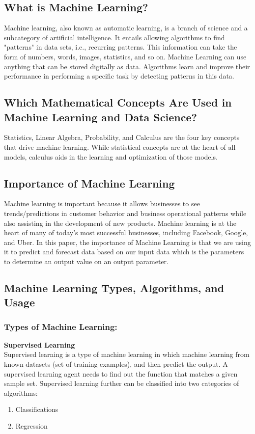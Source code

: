 \subsection{What is Machine Learning?}
Machine learning, also known as automatic learning, is a branch of science and a subcategory of artificial intelligence. It entails allowing algorithms to find "patterns" in data sets, i.e., recurring patterns. This information can take the form of numbers, words, images, statistics, and so on. Machine Learning can use anything that can be stored digitally as data.
Algorithms learn and improve their performance in performing a specific task by detecting patterns in this data.

\subsection{Which Mathematical Concepts Are Used in Machine Learning and Data Science?}
Statistics, Linear Algebra, Probability, and Calculus are the four key concepts that drive machine learning. While statistical concepts are at the heart of all models, calculus aids in the learning and optimization of those models.

\subsection{Importance of Machine Learning}
Machine learning is important because it allows businesses to see trends/predictions in customer behavior and business operational patterns while also assisting in the development of new products. Machine learning is at the heart of many of today's most successful businesses, including Facebook, Google, and Uber. In this paper, the importance of Machine Learning is that we are using it to predict and forecast data based on our input data which is the parameters to determine an output value on an output parameter.

\subsection{Machine Learning Types, Algorithms, and Usage}
\subsubsection{Types of Machine Learning:}
\textbf{Supervised Learning} \\ 
Supervised learning is a type of machine learning in which machine learning
from known datasets (set of training examples), and then predict the output.
A supervised learning agent needs to find out the function that matches a given sample set.
Supervised learning further can be classified into two categories of algorithms:
\begin{enumerate}
\item Classifications
\item Regression
\end{enumerate}

